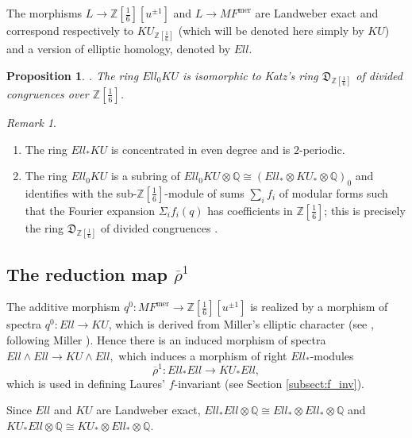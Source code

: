 \documentclass[10pt,a4paper]{amsart}
\newtheorem{prop}[thm]{Proposition}
\theoremstyle{definition}
\theoremstyle{remark}
\newtheorem{rem}[thm]{Remark}
\newcommand{\rhobar}{\overline{\rho}}
\newcommand{\zedsix}{{\zed[{\scriptstyle{\frac{1}{6}}}]}}
\newcommand{\divcong}{\mathfrak{D}}
\newcommand{\zed}{\mathbb{Z}}
\newcommand{\rat}{\mathbb{Q}}
\newcommand{\mf}{{MF}}
\newcommand{\mfmero}{\mf^{\mathrm{mer}}}
\newcommand{\tmf}{{Ell}}
\newcommand{\tmfcoeff}{{Ell}}
\renewcommand{\smash}{\wedge}
\begin{document}
The morphisms $L \rightarrow \zedsix [u^{\pm 1}] $ and $L \rightarrow
\mfmero$ are Landweber exact and correspond respectively to
 $KU_\zedsix$ (which will be denoted here simply by $KU$) and a version of elliptic homology, denoted  by  $\tmf$.



\begin{prop}\cite[Theorem 2.7]{laures}.
The ring $\tmfcoeff _ 0 KU$ is isomorphic to Katz's  ring
$\divcong_\zedsix$ of divided congruences over $\zedsix$.
\end{prop}

\begin{rem}
\
\begin{enumerate}
\item
The ring $\tmfcoeff_* KU $ is concentrated in even degree and is $2$-periodic.
	\item
The ring $\tmfcoeff_0 KU$ is a subring of $\tmfcoeff_0 KU \otimes \rat\cong
(\tmfcoeff_* \otimes KU_* \otimes \rat)_0$ and  identifies with the sub-$\zedsix$-module
of sums $\sum_i f_i $ of modular forms such that the Fourier expansion $\Sigma_i f_i(q)$ has coefficients
in $\zedsix$; this is precisely the ring $\divcong_\zedsix$ of divided congruences \cite{katz}.
\end{enumerate}
\end{rem}

\subsection{The reduction map $\rhobar^1$}
\label{subsect:rho}

The additive morphism $q^0 : \mfmero \rightarrow \zedsix [u^{\pm 1}]$ is
realized by a morphism of spectra $q^0 : \tmf \rightarrow KU$, which is
derived from Miller's elliptic character (see
\cite{laures}, following Miller \cite{millerW}). Hence there is an induced
morphism of spectra
$
	\tmf \smash \tmf
\rightarrow
KU \smash \tmf ,
$
which induces a morphism of right $\tmfcoeff_*$-modules
\[
	\rhobar^1 : \tmfcoeff_* \tmfcoeff
\rightarrow
KU_* \tmfcoeff,
\]
which is used in defining Laures' $f$-invariant \cite{laures}  (see Section \ref{subsect:f_inv}).

Since  $\tmf$ and $KU$ are Landweber exact,  $\tmfcoeff_* \tmfcoeff \otimes \rat \cong
\tmfcoeff_* \otimes \tmfcoeff_* \otimes \rat$ and $KU_* \tmfcoeff \otimes
\rat \cong  KU_*\otimes \tmfcoeff_*  \otimes \rat$.
\end{document}

